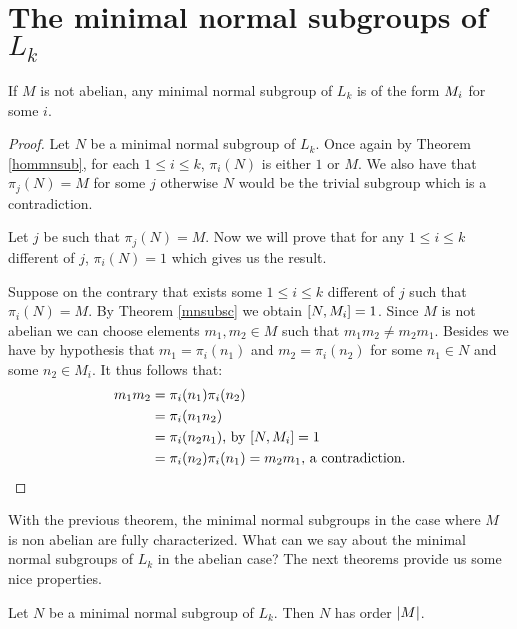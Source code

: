 \section{The minimal normal subgroups of \texorpdfstring{$L_k$}{Lk}}

\begin{theorem}
    \label{nabmnsub}
    If $M$ is not abelian, any minimal normal subgroup of $L_k$ is of the form $M_{i}$ for some $i$.
\end{theorem}

\begin{proof}
    Let $N$ be a minimal normal subgroup of $L_k$.
    Once again by Theorem \ref{hommnsub}, for each $1 \le i \le k$, $\pi_i(N)$ is either $1$ or $M$. We also have that $\pi_j(N) = M$ for some $j$ otherwise $N$ would be the trivial subgroup which is a contradiction.

    Let $j$ be such that $\pi_j(N) = M$. Now we will prove that for any $1 \le i \le k$ different of $j$, $\pi_i(N) = 1$ which gives us the result.
    
    Suppose on the contrary that exists some $1 \le i \le k$ different of $j$ such that $\pi_i(N) = M$.
    By Theorem \ref{mnsubsc} we obtain $[N, M_{i}] = 1$. Since $M$ is not abelian we can choose elements $m_1, m_2 \in M$ such that $m_1m_2 \ne m_2m_1$. Besides we have by hypothesis that $m_1 = \pi_i(n_1)$ and $m_2 = \pi_i(n_2)$ for some $n_1 \in N$ and some  $n_2 \in M_i$. It thus follows that:
    \begin{align*}
       m_1m_2 &= \pi_i(n_1)\pi_i(n_2) \\
              &= \pi_i(n_1n_2) \\
              &= \pi_i(n_2n_1) \text{, by } [N, M_{i}] = 1 \\
              &= \pi_i(n_2)\pi_i(n_1) = m_2m_1 \text{, a contradiction.}
    \end{align*}

\end{proof}

With the previous theorem, the minimal normal subgroups in the case where $M$ is non abelian are fully characterized.
What can we say about the minimal normal subgroups of $L_k$ in the abelian case? The next theorems provide us some nice properties.

\begin{theorem}
    \label{abmnsub}
    Let $N$ be a minimal normal subgroup of $L_k$. Then $N$ has order $| M |$. 
    
\end{theorem}

